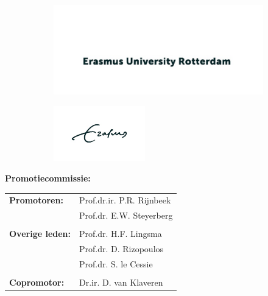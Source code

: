 \begin{figure}[b]
\begin{subfigure}[][][b]{0.4\textwidth}
\includegraphics[width=1.2\linewidth]{figures/left.png}
\end{subfigure}\hspace{27mm}
\begin{subfigure}[][40pt][c]{0.6\textwidth}
\includegraphics[width=0.9\linewidth, height=2.4cm]{figures/right.png}
\end{subfigure}
\end{figure}

\newpage

\textbf{Promotiecommissie:}\par
\vspace*{0.8cm}

\begin{tabular}{l@{}l}
\textbf{Promotoren:} \mbox{} & Prof.dr.ir. P.R. Rijnbeek\\
                             & Prof.dr. E.W. Steyerberg \\
                             & \\
\textbf{Overige leden:} \mbox{} & Prof.dr. H.F. Lingsma \\
                                & Prof.dr. D. Rizopoulos \\
                                & Prof.dr. S. le Cessie \\
                                & \\
\textbf{Copromotor:} \mbox{} & Dr.ir. D. van Klaveren \\
\end{tabular}

\newpage
{}
\tableofcontents
\clearpage

